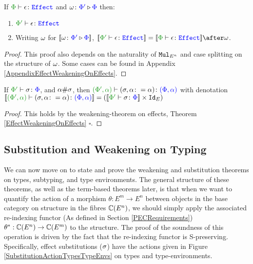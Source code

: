 \documentclass{Report}
\begin{document}
\begin{framed}
    \begin{theorem}\label{EffectWeakeningOnEffects}
       If $\wellformedeffect{\P}{\e}$ and $\omega \colon {\color{blue}\Phi'} \triangleright {\color {blue} \Phi}$ then: 
       \begin{enumerate}[label=\roman*.]
           \item $\wellformedeffect{\P'}{\e}$
           \item Writing $\omega$ for ${\bf [\![}\omega \colon {\color{blue}\Phi'} \triangleright {\color {blue} \Phi}{\bf ]\!]}$,  $\deno{\wellformedeffect{\P'}{\e}} = \deno{\wellformedeffect{\P}{\e}}\after\w$.
       \end{enumerate}    
    \end{theorem}
    
    \begin{proof}
        This proof also depends on the naturality of $\texttt{Mul}_{E^n}$ and case splitting on the structure of $\omega$.  Some cases can be found in Appendix \ref{AppendixEffectWeakeningOnEffects}.
    \end{proof}
\end{framed}


\begin{framed}
    \begin{lemma}\label{ExtensionLemmaOnEffectSubstitutions}
        If $\typerelation{\P'}{\si}{\P}$, and $\alpha\#\sigma$, then $\typerelation{(\P', \a)}{(\si, \a\setto\a)}{(\P,\a)}$ with denotation $\deno{\typerelation{(\P', \a)}{(\si, \a\setto\a)}{(\P,\a)}} = (\deno{\typerelation{\P'}{\si}{\P}}\times\Id{E})$
    \end{lemma}
    \begin{proof}
       This holds by the weakening-theorem on effects, Theorem \ref{EffectWeakeningOnEffects} $\square$.
    \end{proof}
\end{framed}


\subsection{Substitution and Weakening on Typing}
We can now move on to state and prove the weakening and substitution theorems on types, subtyping, and type environments. The general structure of these theorems, as well as the term-based theorems later, is that when we want to quantify the action of a morphism $\theta: E^m \rightarrow E^n$ between objects in the base category on structure in the fibres $\mathbb{C}(E^n)$, we should simply apply the associated re-indexing functor (As defined in Section \ref{PECRequirements}) $\theta^*: \mathbb{C}(E^n) \rightarrow \mathbb{C}(E^m)$ to the structure. The proof of the soundness of this operation is driven by the fact that the re-indexing functor is S-preserving. Specifically, effect substitutions ($\sigma$) have the actions given in Figure \ref{SubstitutionActionTypesTypeEnvs} on types and type-environments.
\end{document}
